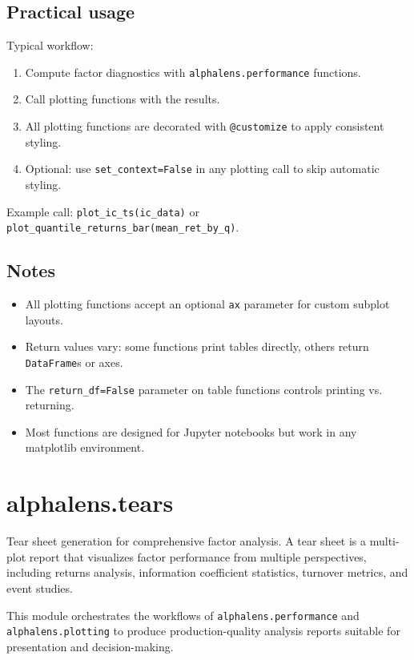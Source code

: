 \documentclass[11pt]{article}
\begin{document}
\subsection{Practical usage}

Typical workflow:

\begin{enumerate}
  \item Compute factor diagnostics with \texttt{alphalens.performance} functions.
  \item Call plotting functions with the results.
  \item All plotting functions are decorated with \texttt{@customize} to apply consistent styling.
  \item Optional: use \texttt{set\_context=False} in any plotting call to skip automatic styling.
\end{enumerate}

Example call: \texttt{plot\_ic\_ts(ic\_data)} or \texttt{plot\_quantile\_returns\_bar(mean\_ret\_by\_q)}.

\subsection{Notes}

\begin{itemize}
  \item All plotting functions accept an optional \texttt{ax} parameter for custom subplot layouts.
  \item Return values vary: some functions print tables directly, others return \texttt{DataFrame}s or axes.
  \item The \texttt{return\_df=False} parameter on table functions controls printing vs. returning.
  \item Most functions are designed for Jupyter notebooks but work in any matplotlib environment.
\end{itemize}

\section{alphalens.tears}

Tear sheet generation for comprehensive factor analysis. A tear sheet is a multi-plot report that visualizes factor performance from multiple perspectives, including returns analysis, information coefficient statistics, turnover metrics, and event studies.

This module orchestrates the workflows of \texttt{alphalens.performance} and \texttt{alphalens.plotting} to produce production-quality analysis reports suitable for presentation and decision-making.
\end{document}
